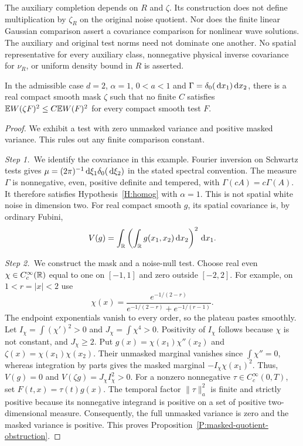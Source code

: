 The auxiliary completion depends on $R$ and $\zeta$. Its construction does not
define multiplication by $\zeta_R$ on the original noise quotient. Nor does the
finite linear Gaussian comparison assert a covariance comparison for nonlinear
wave solutions. The auxiliary and original test norms need not dominate one
another. No spatial representative for every auxiliary class, nonnegative
physical inverse covariance for $\nu_R$, or uniform density bound in $R$ is
asserted.

\begin{proposition}
  \label{P:masked-quotient-obstruction}
  In the admissible case $d = 2$, $\alpha = 1$, $0 < a < 1$ and $\Gamma =
  \delta_0(\,\mathrm{d} x_1)\,\mathrm{d} x_2$, there is a real compact smooth mask $\zeta$ such
  that no finite $C$ satisfies $\mathbb{E} W(\zeta F)^2 \le C\mathbb{E} W(F)^2$ for every
  compact smooth test $F$.
\end{proposition}

\begin{proof}
  We exhibit a test with zero unmasked variance and positive masked variance.
  This rules out any finite comparison constant.

  \medskip
  \noindent\textit{Step 1.~}We identify the covariance in this example.
  Fourier inversion on Schwartz tests gives $\mu =
  (2\pi)^{-1}\,\mathrm{d}\xi_1\delta_0(\,\mathrm{d}\xi_2)$ in the stated spectral convention. The
  measure $\Gamma$ is nonnegative, even, positive definite and tempered, with
  $\Gamma(cA) = c\Gamma(A)$. It therefore satisfies Hypothesis~\ref{H:homog}
  with $\alpha = 1$. This is not spatial white noise in dimension two. For real
  compact smooth $g$, its spatial covariance is, by ordinary Fubini,
  \[
    V(g) = \int_{\mathbb{R}}\left(\int_{\mathbb{R}} g(x_1,x_2)\,\mathrm{d} x_2\right)^2\,\mathrm{d} x_1.
  \]

  \medskip
  \noindent\textit{Step 2.~}We construct the mask and a noise-null test.
  Choose real even $\chi \in C_c^\infty(\mathbb{R})$ equal to one on $[-1,1]$ and zero
  outside $[-2,2]$. For example, on $1 < r = |x| < 2$ use
  \[
    \chi(x) = \frac{e^{-1/(2-r)}}{e^{-1/(2-r)}+e^{-1/(r-1)}}.
  \]
  The endpoint exponentials vanish to every order, so the plateau pastes
  smoothly. Let $I_\chi = \int(\chi')^2 > 0$ and $J_\chi = \int\chi^4 > 0$.
  Positivity of $I_\chi$ follows because $\chi$ is not constant, and $J_\chi \ge
  2$. Put $g(x) = \chi(x_1)\chi''(x_2)$ and $\zeta(x) = \chi(x_1)\chi(x_2)$.
  Their unmasked marginal vanishes since $\int\chi'' = 0$, whereas integration
  by parts gives the masked marginal $-I_\chi\chi(x_1)^2$. Thus, $V(g) = 0$ and
  $V(\zeta g) = J_\chi I_\chi^2 > 0$. For a nonzero nonnegative $\tau \in
  C_c^\infty(0,T)$, set $F(t,x) = \tau(t)g(x)$. The temporal factor
  $\|\tau\|_a^2$ is finite and strictly positive because its nonnegative
  integrand is positive on a set of positive two-dimensional measure.
  Consequently, the full unmasked variance is zero and the masked variance is
  positive. This proves Proposition~\ref{P:masked-quotient-obstruction}.
\end{proof}

